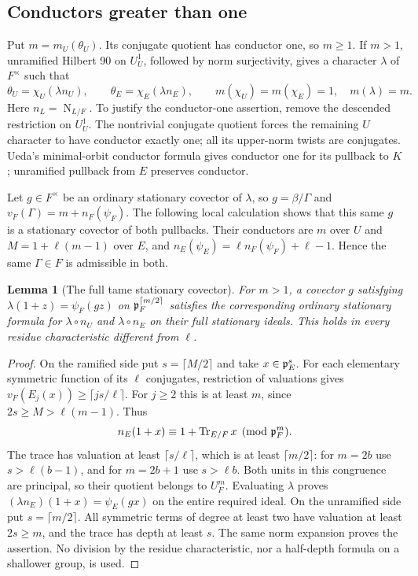\documentclass[11pt]{amsart}
\newtheorem{lemma}[theorem]{Lemma}
\theoremstyle{definition}
\theoremstyle{remark}
\newcommand{\Tr}{\operatorname{Tr}}
\newcommand{\Nm}{\operatorname{N}}
\begin{document}
\subsection{Conductors greater than one}
Put $m=m_U(\theta_U)$. Its conjugate quotient has conductor one, so
$m\ge1$. If $m>1$, unramified Hilbert 90 on $U_U^1$, followed by
norm surjectivity, gives a character $\lambda$ of $F^\times$ such
that
\[
 \theta_U=\chi_U(\lambda n_U),\qquad
 \theta_E=\chi_E(\lambda n_E),\qquad
 m(\chi_U)=m(\chi_E)=1,\quad m(\lambda)=m.
\]
Here $n_L=\Nm_{L/F}$. To justify the conductor-one assertion, remove
the descended restriction on $U_U^1$. The nontrivial conjugate
quotient forces the remaining $U$ character to have conductor exactly
one; all its upper-norm twists are conjugates. Ueda's minimal-orbit
conductor formula gives conductor one for its pullback to $K$;
unramified pullback from $E$ preserves conductor.

Let $g\in F^\times$ be an ordinary stationary covector of
$\lambda$, so $g=\beta/\Gamma$ and
$v_F(\Gamma)=m+n_F(\psi_F)$. The following local calculation shows that
this same $g$ is a stationary covector of both pullbacks. Their conductors
are $m$ over $U$ and $M=1+\ell(m-1)$ over $E$, and
$n_E(\psi_E)=\ell n_F(\psi_F)+\ell-1$. Hence the same
$\Gamma\in F$ is admissible in both.

\begin{lemma}[The full tame stationary covector]\label{U:tame-covector}
For $m>1$, a covector $g$ satisfying
$\lambda(1+z)=\psi_F(gz)$ on $\mathfrak p_F^{\lceil m/2\rceil}$
satisfies the corresponding ordinary stationary formula for
$\lambda\circ n_U$ and $\lambda\circ n_E$ on their full stationary
ideals. This holds in every residue characteristic different from $\ell$.
\end{lemma}
\begin{proof}
On the ramified side put $s=\lceil M/2\rceil$ and take
$x\in\mathfrak p_E^s$. For each elementary symmetric function of its $\ell$
conjugates, restriction of valuations gives
$v_F(E_j(x))\ge\lceil js/\ell\rceil$. For $j\ge2$ this is at least $m$,
since $2s\ge M>\ell(m-1)$. Thus
\[
 n_E(1+x)\equiv1+\Tr_{E/F}x\pmod{\pp_F^m}.
\]
The trace has valuation at least $\lceil s/\ell\rceil$, which is at
least $\lceil m/2\rceil$: for $m=2b$ use
$s>\ell(b-1)$, and for $m=2b+1$ use $s>\ell b$.
Both units in this congruence are principal, so their quotient belongs to
$U_F^m$. Evaluating $\lambda$ proves
$(\lambda n_E)(1+x)=\psi_E(gx)$ on the entire required ideal.
On the unramified side put $s=\lceil m/2\rceil$. All symmetric terms
of degree at least two have valuation at least $2s\ge m$, and the trace
has depth at least $s$. The same norm expansion proves the assertion.
No division by the residue characteristic, nor a half-depth formula on a
shallower group, is used.
\end{proof}
\end{document}
